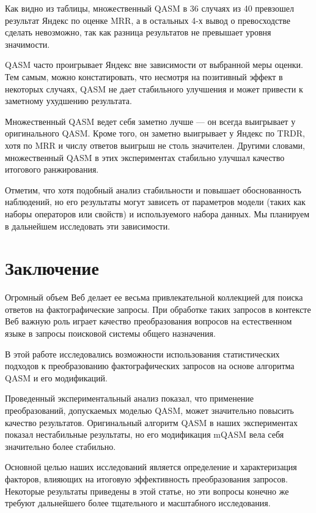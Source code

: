 \documentclass{article}
\begin{document}
Как видно из таблицы, множественный QASM в 36 случаях из 40 превзошел результат Яндекс по
оценке MRR, а в остальных 4-х вывод о превосходстве сделать невозможно, так
как разница результатов не превышает уровня значимости.

QASM часто проигрывает Яндекс вне зависимости от
выбранной меры оценки. Тем самым, можно констатировать, что несмотря на
позитивный эффект в некоторых случаях, QASM не дает стабильного улучшения и
может привести к заметному ухудшению результата.

Множественный QASM ведет себя заметно лучше --- он всегда выигрывает у
оригинального QASM. Кроме того, он заметно выигрывает у Яндекс по TRDR, хотя
по MRR и числу ответов выигрыш не столь значителен. 
Другими словами, множественный QASM 
в этих экспериментах стабильно улучшал качество итогового ранжирования.

Отметим, что хотя подобный анализ стабильности и повышает 
обоснованность наблюдений, но его результаты могут зависеть от 
параметров модели (таких как наборы операторов или свойств) 
и используемого набора данных. Мы планируем в дальнейшем исследовать эти зависимости.

\section{Заключение}

Огромный объем Веб делает ее весьма привлекательной коллекцией для
поиска ответов на фактографические запросы.  При обработке таких запросов в
контексте Веб важную роль играет качество преобразования вопросов на
естественном языке в запросы поисковой системы общего назначения.

В этой работе исследовались возможности использования статистических
подходов к преобразованию фактографических запросов
на основе алгоритма QASM и его модификаций.

Проведенный экспериментальный анализ показал, что применение
преобразований, допускаемых моделью QASM, может значительно повысить 
качество результатов. Оригинальный алгоритм QASM 
в наших экспериментах показал нестабильные результаты, 
но его модификация mQASM вела себя значительно более стабильно.

Основной целью наших исследований является определение и 
характеризация факторов, влияющих на итоговую эффективность 
преобразования запросов. Некоторые результаты приведены в этой 
статье, но эти вопросы конечно же требуют дальнейшего 
более тщательного и масштабного исследования.
\end{document}

